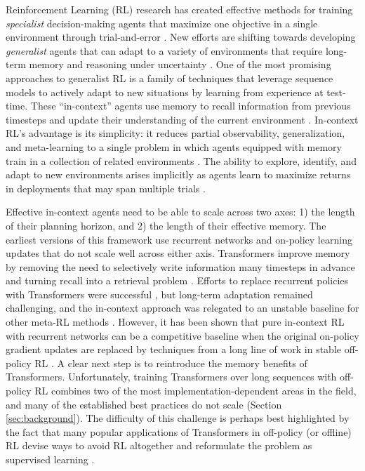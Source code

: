 \label{sec:intro}

Reinforcement Learning (RL) research has created effective methods for training \textit{specialist} decision-making agents that maximize one objective in a single environment through trial-and-error \cite{badia2020agent57, berner2019dota, mnih2015human, silver2018general, vinyals2019grandmaster}. New efforts are shifting towards developing \textit{generalist} agents that can adapt to a variety of environments that require long-term memory and reasoning under uncertainty \cite{kirk2022survey, fan2022minedojo, team2023human, reed2022generalist}. One of the most promising approaches to generalist RL is a family of techniques that leverage sequence models to actively adapt to new situations by learning from experience at test-time. These ``in-context'' agents use memory to recall information from previous timesteps and update their understanding of the current environment \cite{wang2016learning, duan2016rl}. In-context RL's advantage is its simplicity: it reduces partial observability, generalization, and meta-learning to a single problem in which agents equipped with memory train in a collection of related environments \cite{beck2023survey, zintgraf2022fast, ghosh2021generalization}. The ability to explore, identify, and adapt to new environments arises implicitly as agents learn to maximize returns in deployments that may span multiple trials \cite{zintgraf2022fast, ortega2019meta, botvinick2019reinforcement}. 

Effective in-context agents need to be able to scale across two axes: 1) the length of their planning horizon, and 2) the length of their effective memory. The earliest versions of this framework \cite{wang2016learning, duan2016rl, stadie2018some} use recurrent networks and on-policy learning updates that do not scale well across either axis. Transformers \cite{vaswani2017attention} improve memory by removing the need to selectively write information many timesteps in advance and turning recall into a retrieval problem \cite{rae2020transformers}. Efforts to replace recurrent policies with Transformers were successful \cite{melo2022transformers, mishra2017simple}, but long-term adaptation remained challenging, and the in-context approach was relegated to an unstable baseline for other meta-RL methods \cite{beck2023survey}. However, it has been shown that pure in-context RL with recurrent networks can be a competitive baseline when the original on-policy gradient updates are replaced by techniques from a long line of work in stable off-policy RL \cite{ni2022recurrent, fakoor2019meta}. A clear next step is to reintroduce the memory benefits of Transformers. Unfortunately, training Transformers over long sequences with off-policy RL combines two of the most implementation-dependent areas in the field, and many of the established best practices do not scale (Section \ref{sec:background}). The difficulty of this challenge is perhaps best highlighted by the fact that many popular applications of Transformers in off-policy (or offline) RL devise ways to avoid RL altogether and reformulate the problem as supervised learning \cite{chen2021decision, lee2022multi, janner2021reinforcement, zheng2022online, laskin2022context, shi2023cross}.

